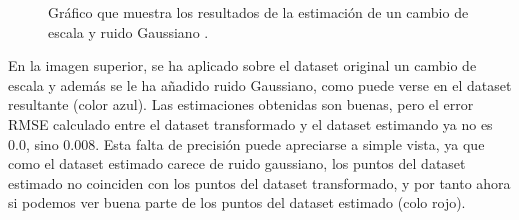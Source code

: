 \begin{figure}
\begin{center}
\hspace{0.5cm}

\end{center}

\caption{Gráfico que muestra los resultados de la estimación de un cambio de escala y ruido Gaussiano .}
\end{figure}

En la imagen superior, se ha aplicado sobre el dataset original un cambio de escala y además se le ha añadido ruido Gaussiano, como puede verse en el dataset resultante (color azul). Las estimaciones obtenidas son buenas, pero el error RMSE calculado entre el dataset transformado y el dataset estimando ya no es 0.0, sino 0.008. Esta falta de precisión puede apreciarse a simple vista, ya que como el dataset estimado carece de ruido gaussiano, los puntos del dataset estimado no coinciden con los puntos del dataset transformado, y por tanto ahora si podemos ver buena parte de los puntos del dataset estimado (colo rojo).

